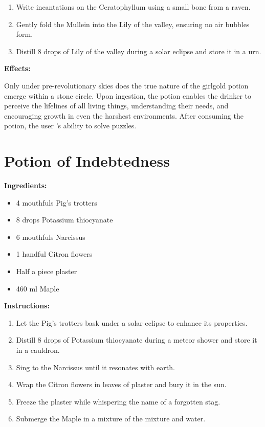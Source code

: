 \documentclass{article}
\begin{document}
\begin{enumerate}
  \item Write incantations on the Ceratophyllum using a small bone from a raven.
  \item Gently fold the Mullein into the Lily of the valley, ensuring no air bubbles form.
  \item Distill 8 drops of Lily of the valley during a solar eclipse and store it in a urn.
\end{enumerate}

\textbf{Effects:}

Only under pre-revolutionary skies does the true nature of the girlgold potion emerge within a stone circle. Upon ingestion, the potion enables the drinker to perceive the lifelines of all living things, understanding their needs, and encouraging growth in even the harshest environments. After consuming the potion, the user 's ability to solve puzzles.

\newpage
\section*{Potion of Indebtedness}

\textbf{Ingredients:}

\begin{itemize}
  \item 4 mouthfuls Pig's trotters
  \item 8 drops Potassium thiocyanate
  \item 6 mouthfuls Narcissus
  \item 1 handful Citron flowers
  \item Half a piece plaster
  \item 460 ml Maple
\end{itemize}

\textbf{Instructions:}

\begin{enumerate}
  \item Let the Pig's trotters bask under a solar eclipse to enhance its properties.
  \item Distill 8 drops of Potassium thiocyanate during a meteor shower and store it in a cauldron.
  \item Sing to the Narcissus until it resonates with earth.
  \item Wrap the Citron flowers in leaves of plaster and bury it in the sun.
  \item Freeze the plaster while whispering the name of a forgotten stag.
  \item Submerge the Maple in a mixture of the mixture and water.
\end{enumerate}
\end{document}
